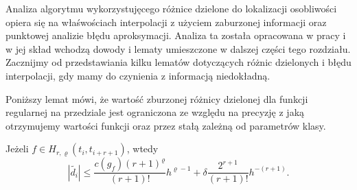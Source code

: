 \documentclass[oik, pdftex, man]{mgrwms}
\begin{document}
    Analiza algorytmu wykorzystujęcego różnice dzielone do lokalizacji osobliwości opiera się na właśwościach interpolacji z użyciem zaburzonej informacji oraz punktowej analizie błędu aproksymacji. Analiza ta została opracowana w pracy \cite{AoP} i w jej skład wchodzą dowody i lematy umieszczone w dalszej części tego rozdziału. Zacznijmy od przedstawiania kilku lematów dotyczących różnic dzielonych i błędu interpolacji, gdy mamy do czynienia z informacją niedokładną.
    
    Poniższy lemat mówi, że wartość zburzonej różnicy dzielonej dla funkcji regularnej na przedziale jest ograniczona ze względu na precyzję z jaką otrzymujemy wartości funkcji oraz przez stałą zależną od parametrów klasy.

    \begin{lemma} \label{lem:algMP_1}
        Jeżeli $f \in H_{r, \varrho}(t_{i}, t_{i+r+1})$, wtedy
        \begin{equation*}
            |\tilde{d_{i}}| \leq \frac{c(g_{f})(r+1)^{\varrho}}{(r+1)!} h^{\varrho-1} + \delta \frac{2^{r+1}}{(r+1)!} h^{-(r+1)}.
        \end{equation*}
    \end{lemma}
\end{document}
